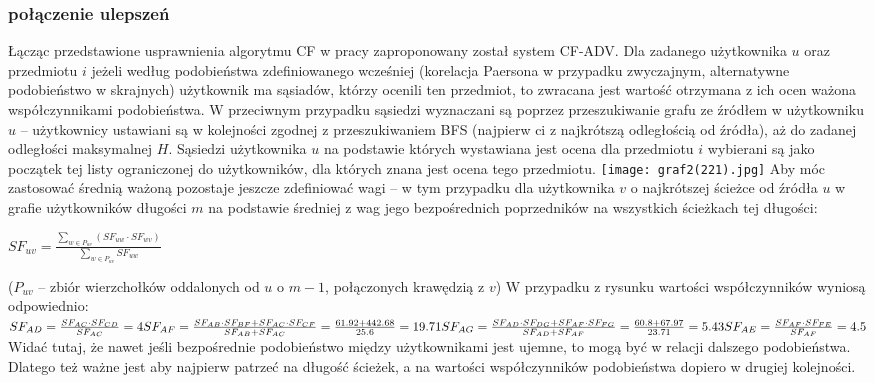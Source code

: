 \documentclass{pracamgr}
\begin{document}
    \subsubsection{połączenie ulepszeń}
     Łącząc przedstawione usprawnienia algorytmu CF w pracy \cite{221} zaproponowany został system CF-ADV.\newline
     Dla zadanego użytkownika $u$ oraz przedmiotu $i$ jeżeli według podobieństwa zdefiniowanego wcześniej
     (korelacja Paersona w przypadku zwyczajnym, alternatywne podobieństwo w skrajnych) użytkownik ma sąsiadów, którzy ocenili ten przedmiot,
     to zwracana jest wartość otrzymana z ich ocen ważona współczynnikami podobieństwa.\newline
     W przeciwnym przypadku sąsiedzi wyznaczani są poprzez przeszukiwanie grafu ze źródłem w użytkowniku $u$
     -- użytkownicy ustawiani są w kolejności zgodnej z przeszukiwaniem BFS (najpierw ci z najkrótszą odległością od źródła),
     aż do zadanej odległości maksymalnej $H$.
     Sąsiedzi użytkownika $u$ na podstawie których wystawiana jest ocena dla przedmiotu $i$
     wybierani są jako początek tej listy ograniczonej do użytkowników, dla których znana jest ocena tego przedmiotu.\newline
     \texttt{[image: graf2(221).jpg]}\newline
     Aby móc zastosować średnią ważoną pozostaje jeszcze zdefiniować wagi
     -- w tym przypadku dla użytkownika $v$ o najkrótszej ścieżce od źródła $u$ w grafie użytkowników długości $m$
     na podstawie średniej z wag jego bezpośrednich poprzedników na wszystkich ścieżkach tej długości:
     \begin{center}
      $SF_{uv}=\frac{\sum_{w\in P_{uv}}(SF_{uw}\cdot SF_{wv})}{\sum_{w\in P_{uv}}SF_{uw}}$
     \end{center}
     {\scriptsize
      ($P_{uv}$ -- zbiór wierzchołków oddalonych od $u$ o $m-1$, połączonych krawędzią z $v$)
     }\newline
     W przypadku z rysunku wartości współczynników wyniosą odpowiednio:\newline
     $
     SF_{AD}=\frac{SF_{AC}\cdot SF_{CD}}{SF_{AC}}=4\newline
     SF_{AF}=\frac{SF_{AB}\cdot SF_{BF}+SF_{AC}\cdot SF_{CF}}{SF_{AB}+SF_{AC}}=\frac{61.92+442.68}{25.6}=19.71\newline
     SF_{AG}=\frac{SF_{AD}\cdot SF_{DG}+SF_{AF}\cdot SF_{FG}}{SF_{AD}+SF_{AF}}=\frac{60.8+67.97}{23.71}=5.43\newline
     SF_{AE}=\frac{SF_{AF}\cdot SF_{FE}}{SF_{AF}}=4.5\newline   
     $
     Widać tutaj, że nawet jeśli bezpośrednie podobieństwo między użytkownikami jest ujemne, to mogą być w relacji dalszego podobieństwa.
     Dlatego też ważne jest aby najpierw patrzeć na długość ścieżek, a na wartości współczynników podobieństwa dopiero w drugiej kolejności.
\end{document}
